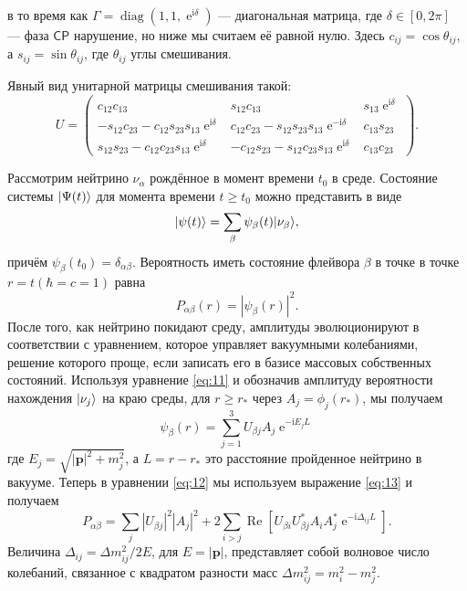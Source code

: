\documentclass[a4paper,12pt]{article}
\newcommand\Vect[1]{{\boldsymbol{#1}}}
\newcommand{\diag}{\operatorname{diag}}
\renewcommand{\Re}{\operatorname{Re}}
\renewcommand{\exp}{\operatorname{e}}
\renewcommand{\imath}{\mathrm{i}}
\DeclarePairedDelimiter\ket{|}{\rangle}
\begin{document}
	 в то время как \(\Gamma=\diag(1,1,\exp^{\imath\delta})\) --- диагональная матрица, где
	\(\delta\in[0, 2\pi]\) --- фаза \(\mathsf{CP}\) нарушение, но ниже мы считаем
	её равной нулю. Здесь \(c_{ij}=\cos\theta_{ij}\), а \(s_{ij}=\sin\theta_{ij}\), где \(\theta_{ij}\) углы смешивания.

	Явный вид унитарной матрицы смешивания такой:
	\begin{equation}
		U=
		\begin{pmatrix}
  			c_{12}c_{13} & s_{12}c_{13} & s_{13}\exp^{\imath\delta}\\
  			-s_{12}c_{23}-c_{12}s_{23}s_{13}\exp^{\imath\delta} & c_{12}c_{23}-s_{12}s_{23}s_{13}\exp^{-\imath\delta} & c_{13}s_{23}\\
  			s_{12}s_{23}-c_{12}c_{23}s_{13}\exp^{\imath\delta} & -c_{12}s_{23}-s_{12}c_{23}s_{13}\exp^{\imath\delta} & c_{13}c_{23}
  		\end{pmatrix}.
	\end{equation}

	Рассмотрим нейтрино \(\nu_{\alpha}\) рождённое в момент времени
	\(t_{0}\) в среде. Состояние системы \(\ket{\Psi(t)}\) для момента времени
	\(t\geqslant t_{0}\) можно представить в виде
	\begin{equation}
		\ket{\psi(t)}=\sum_{\beta}\psi_{\beta}(t)\ket{\nu_{\beta}},
	\end{equation}
	причём \(\psi_{\beta}(t_{0})=\delta_{\alpha\beta}\). Вероятность иметь
	состояние флейвора \(\beta\) в точке в точке \(r=t (\hbar=c=1)\) равна
	\begin{equation}\label{eq:12}
		P_{\alpha\beta}(r)=|\psi_{\beta}(r)|^{2}.
	\end{equation}
	После того, как нейтрино покидают среду, амплитуды
	эволюционируют в соответствии с уравнением, которое
	управляет вакуумными колебаниями, решение которого
	проще, если записать его в базисе массовых собственных
	состояний. Используя уравнение \eqref{eq:11} и обозначив амплитуду вероятности
	нахождения
	\(\ket{\nu_{j}}\) на краю среды, для \(r\geq r_{*}\) через \(A_{j}=\phi_{j}(r_{*})\), мы получаем
	\begin{equation}\label{eq:13}
		\psi_{\beta}(r)=\sum_{j=1}^{3}U_{\beta j}A_{j}\exp^{-\imath E_{j}L}
	\end{equation}
	где \(E_{j}=\sqrt{|\Vect{p}|^{2}+m_{j}^{2}}\), а \(L=r-r_{*}\) это расстояние
	пройденное нейтрино в вакууме. Теперь в
	уравнении \eqref{eq:12} мы используем выражение \eqref{eq:13} и получаем
	\begin{equation}\label{eq:17}
		P_{\alpha\beta}=\sum_{j}|U_{\beta j}|^{2}|A_{j}|^{2}+2\sum_{i>j}\Re[U_{\beta i}U_{\beta j}^{*}A_{i}A_{j}^{*}\exp^{-\imath\Delta_{ij}L}].
	\end{equation}
	Величина \(\Delta_{ij}=\Delta m_{ij}^2/2E\), для \(E=|\Vect{p}|\), представляет собой  волновое число колебаний, связанное с квадратом разности масс
	\(\Delta m_{ij}^{2}=m_{i}^{2}-m_{j}^{2}\).
\end{document}
